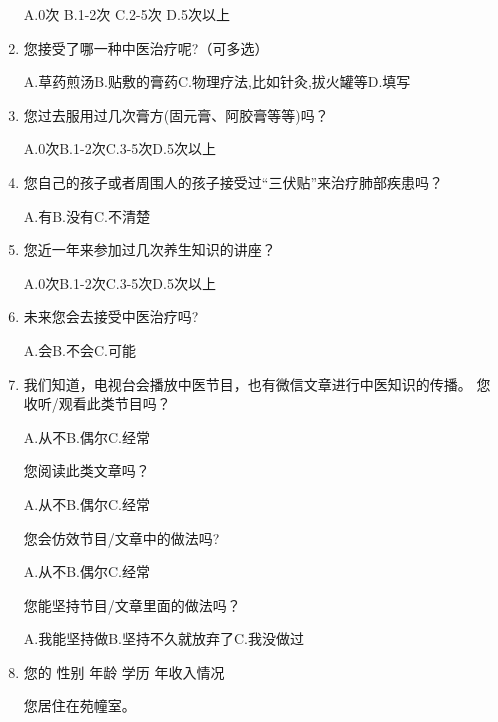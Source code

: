 \documentclass{article}
\begin{document}
\begin{spacing}{0.9}
\begin{enumerate}
A.0次 \qquad
B.1-2次\qquad
C.2-5次\qquad
D.5次以上

\item
您接受了哪一种中医治疗呢?（可多选）

A.草药煎汤\qquad B.贴敷的膏药\qquad C.物理疗法,比如针灸,拔火罐等\qquad D.填写\underline{\makebox[6em]{}}

\item 您过去服用过几次膏方(固元膏、阿胶膏等等)吗？

A.0次\qquad B.1-2次\qquad C.3-5次\qquad D.5次以上

\item 您自己的孩子或者周围人的孩子接受过“三伏贴”来治疗肺部疾患吗？

A.有\qquad B.没有\qquad C.不清楚

\item 
您近一年来参加过几次养生知识的讲座？

A.0次\qquad B.1-2次\qquad C.3-5次\qquad D.5次以上

\item 
未来您会去接受中医治疗吗?

A.会\qquad B.不会\qquad C.可能 

\item 
我们知道，电视台会播放中医节目，也有微信文章进行中医知识的传播。
\subitem 
   您收听/观看此类节目吗？
   
    A.从不\qquad B.偶尔\qquad C.经常

	\subitem 
    您阅读此类文章吗？
	
    A.从不\qquad B.偶尔\qquad C.经常
    
    \subitem 
    您会仿效节目/文章中的做法吗?
	
	A.从不\qquad B.偶尔\qquad C.经常
    
    \subitem 
   您能坚持节目/文章里面的做法吗？
   
    A.我能坚持做\qquad B.坚持不久就放弃了\qquad C.我没做过
    
\item 
您的
性别\underline{\makebox[6em]{}}
年龄\underline{\makebox[6em]{}}
学历\underline{\makebox[6em]{}}
年收入情况\underline{\makebox[6em]{}}

您居住在\underline{\makebox[3em]{}}苑\underline{\makebox[2em]{}}幢\underline{\makebox[2em]{}}室。


\end{enumerate}
\end{spacing}
\end{document}
